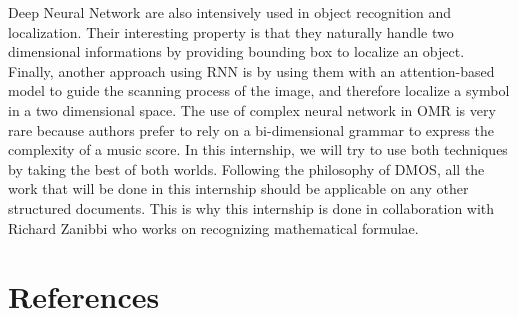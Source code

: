 \documentclass[11pt]{sdm}
\begin{document}
Deep Neural Network are also intensively used in object recognition and localization.
Their interesting property is that they naturally handle two dimensional informations by providing bounding box to localize an object.
Finally, another approach using RNN is by using them with an attention-based model to guide the scanning process of the image, and therefore localize a symbol in a two dimensional space.
The use of complex neural network in OMR is very rare because authors prefer to rely on a bi-dimensional grammar to express the complexity of a music score.
In this internship, we will try to use both techniques by taking the best of both worlds.
Following the philosophy of DMOS, all the work that will be done in this internship should be applicable on any other structured documents.
This is why this internship is done in collaboration with Richard Zanibbi who works on recognizing mathematical formulae.

\section*{References}



\end{document}
